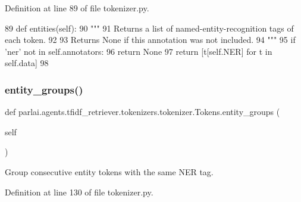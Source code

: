 Definition at line 89 of file tokenizer.\+py.


\begin{DoxyCode}
89     \textcolor{keyword}{def }entities(self):
90         \textcolor{stringliteral}{"""}
91 \textcolor{stringliteral}{        Returns a list of named-entity-recognition tags of each token.}
92 \textcolor{stringliteral}{}
93 \textcolor{stringliteral}{        Returns None if this annotation was not included.}
94 \textcolor{stringliteral}{        """}
95         \textcolor{keywordflow}{if} \textcolor{stringliteral}{'ner'} \textcolor{keywordflow}{not} \textcolor{keywordflow}{in} self.annotators:
96             \textcolor{keywordflow}{return} \textcolor{keywordtype}{None}
97         \textcolor{keywordflow}{return} [t[self.NER] \textcolor{keywordflow}{for} t \textcolor{keywordflow}{in} self.data]
98 
\end{DoxyCode}
\mbox{\label{classparlai_1_1agents_1_1tfidf__retriever_1_1tokenizers_1_1tokenizer_1_1Tokens_af76da989bcd6090398f0e63b8c30de22}} 
\subsubsection{\texorpdfstring{entity\+\_\+groups()}{entity\_groups()}}
{\footnotesize\ttfamily def parlai.\+agents.\+tfidf\+\_\+retriever.\+tokenizers.\+tokenizer.\+Tokens.\+entity\+\_\+groups (\begin{DoxyParamCaption}\item[{}]{self }\end{DoxyParamCaption})}

\begin{DoxyVerb}Group consecutive entity tokens with the same NER tag.
\end{DoxyVerb}
 

Definition at line 130 of file tokenizer.\+py.



